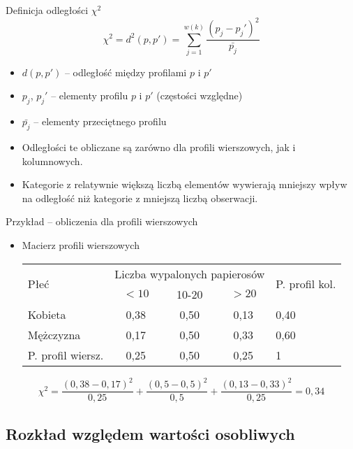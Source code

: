 \documentclass{beamer}
\begin{document}
\begin{frame}{Definicja odległości $\chi^2$}
  $$\chi^2 = d^2(p,p') = \sum_{j=1}^{w(k)} \frac{(p_j-p_j')^2}{\bar{p_j}} $$
  \begin{itemize}
  \item $d(p,p')$ -- odległość między profilami $p$ i $p'$
  \item $p_j$, $p_j'$ -- elementy profilu $p$ i $p'$ (częstości względne)
  \item $\bar{p_j}$ -- elementy przeciętnego profilu
  \item Odległości te obliczane są zarówno dla profili wierszowych, jak i kolumnowych.
  \item Kategorie z relatywnie większą liczbą elementów wywierają mniejszy wpływ na odległość niż kategorie z mniejszą liczbą obserwacji.
  \end{itemize}
\end{frame}

\begin{frame}{Przykład -- obliczenia dla profili wierszowych}
  \begin{itemize}
  \item Macierz profili wierszowych
\begin{tabular}{|p{2cm}|c|c|c|p{2cm}|}\hline
\multirow{2}{*}{Płeć} & \multicolumn{3}{|c|}{Liczba wypalonych papierosów}& \multirow{2}{*}{P. profil kol.}\\ \cline{2-4}
& $<10$ & 10-20 & $>20$ & \\ \hline
Kobieta & 0,38 & 0,50 & 0,13 & 0,40\\\hline
Mężczyzna & 0,17 & 0,50 & 0,33 & 0,60\\\hline
P. profil wiersz. & 0,25 & 0,50 & 0,25 & 1\\\hline
\end{tabular}
  \end{itemize}
  $$\chi^2 = \frac{(0,38-0,17)^2}{0,25} + \frac{(0,5-0,5)^2}{0,5} + \frac{(0,13-0,33)^2}{0,25}=0,34 $$
\end{frame}

\subsection{Rozkład względem wartości osobliwych}
\end{document}
